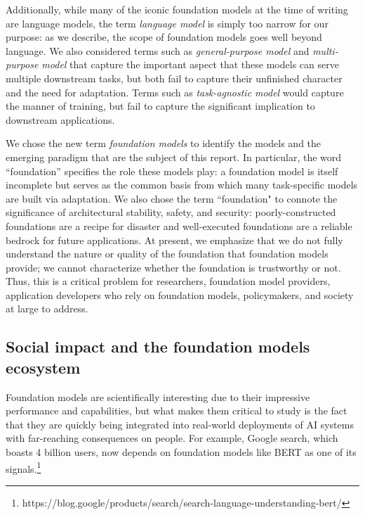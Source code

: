 Additionally, while many of the iconic foundation models at the time of writing are language models, the term \textit{language model} is simply too narrow for our purpose: as we describe, the scope of foundation models goes well beyond language. We also considered terms such as \emph{general-purpose model} and \emph{multi-purpose model} that capture the important aspect that these models can serve multiple downstream tasks, but both fail to capture their unfinished character and the need for adaptation. Terms such as \emph{task-agnostic model} would capture the manner of training, but fail to capture the significant implication to downstream applications.

We chose the new term \emph{foundation models} to identify the models and the emerging paradigm that are the subject of this report. In particular, the word ``foundation'' specifies the role these models play: a foundation model is itself incomplete but serves as the common basis from which many task-specific models are built via adaptation. We also chose the term ``foundation" to connote the significance of architectural stability, safety, and security: poorly-constructed foundations are a recipe for disaster and well-executed foundations are a reliable bedrock for future applications. At present, we emphasize that we do not fully understand the nature or quality of the foundation that foundation models provide; we cannot characterize whether the foundation is trustworthy or not. Thus, this is a critical problem for researchers, foundation model providers, application developers who rely on foundation models, policymakers, and society at large to address.

\subsection{Social impact and the foundation models ecosystem}
\label{sec:ecosystem}

Foundation models are scientifically interesting due to their impressive performance and capabilities, but what makes them critical to study is the fact that they are quickly being integrated into real-world deployments of AI systems with far-reaching consequences on people. For example, Google search, which boasts 4 billion users, now depends on foundation models like BERT \citep{devlin2019bert} as one of its
signals.\footnote{https://blog.google/products/search/search-language-understanding-bert/}

